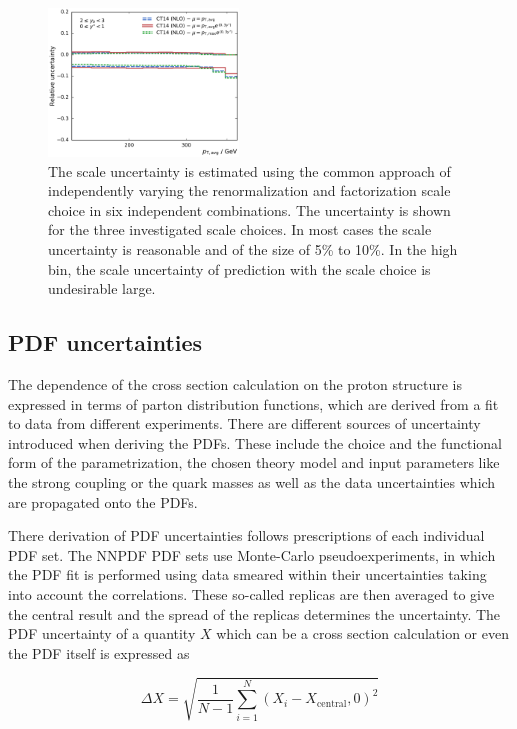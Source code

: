 \begin{figure}[htp]
    \includegraphics[width=0.45\textwidth]{figures/theory/scale_uncert_comp_yb2ys0.pdf}
    \caption{The scale uncertainty is estimated using the common approach of
        independently varying the renormalization and factorization scale
        choice in six independent combinations. The uncertainty is shown for the
        three investigated scale choices. In most cases the scale uncertainty is
        reasonable and of the size of 5\% to 10\%. In the high \ystar bin, the
        scale uncertainty of prediction with the \ptavg scale choice is
        undesirable large.}
    \label{fig:scale_uncertainties}
\end{figure}

\subsection{PDF uncertainties}

The dependence of the cross section calculation on the proton structure is
expressed in terms of parton distribution functions, which are derived from a
fit to data from different experiments. There are different sources of
uncertainty introduced when deriving the PDFs. These include the choice and the
functional form of the parametrization, the chosen theory model and input
parameters like the strong coupling or the quark masses as well as the data
uncertainties which are propagated onto the PDFs.

There derivation of PDF uncertainties follows prescriptions of each individual
PDF set. The NNPDF PDF sets use Monte-Carlo pseudoexperiments, in which the PDF
fit is performed using data smeared within their uncertainties taking into
account the correlations. These so-called replicas are then averaged to give the
central result and the spread of the replicas determines the uncertainty. The
PDF uncertainty of a quantity $X$ which can be a cross section calculation or
even the PDF itself is expressed as

\begin{equation*}
    \Delta X = \sqrt{\frac{1}{N-1} \sum_{i=1}^N \left( X_{i} - X_{\mathrm{central}} , 0 \right)^2}
\end{equation*}

